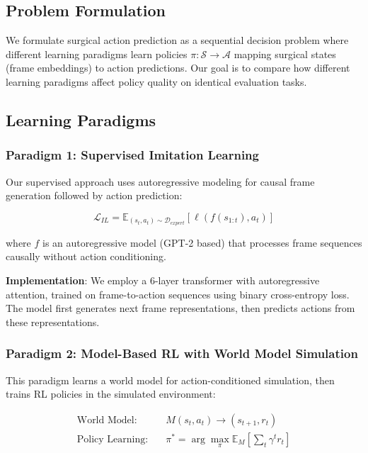 \documentclass[conference]{IEEEtran}
\begin{document}
\subsection{Problem Formulation}

We formulate surgical action prediction as a sequential decision problem where different learning paradigms learn policies $\pi: \mathcal{S} \rightarrow \mathcal{A}$ mapping surgical states (frame embeddings) to action predictions. Our goal is to compare how different learning paradigms affect policy quality on identical evaluation tasks.

\subsection{Learning Paradigms}

\subsubsection{Paradigm 1: Supervised Imitation Learning}

Our supervised approach uses autoregressive modeling for causal frame generation followed by action prediction:

\begin{equation}
\mathcal{L}_{IL} = \mathbb{E}_{(s_t, a_t) \sim \mathcal{D}_{expert}}[\ell(f(s_{1:t}), a_t)]
\end{equation}

where $f$ is an autoregressive model (GPT-2 based) that processes frame sequences causally without action conditioning.

\textbf{Implementation}: We employ a 6-layer transformer with autoregressive attention, trained on frame-to-action sequences using binary cross-entropy loss. The model first generates next frame representations, then predicts actions from these representations.

\subsubsection{Paradigm 2: Model-Based RL with World Model Simulation}

This paradigm learns a world model for action-conditioned simulation, then trains RL policies in the simulated environment:

\begin{align}
\text{World Model:} \quad &M(s_t, a_t) \rightarrow (s_{t+1}, r_t) \\
\text{Policy Learning:} \quad &\pi^* = \arg\max_\pi \mathbb{E}_M\left[\sum_t \gamma^t r_t\right]
\end{align}
\end{document}
